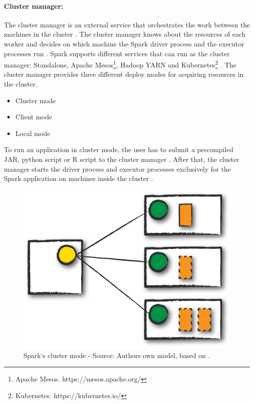 \paragraph{Cluster manager:}
The cluster manager is an external service that orchestrates the work between the machines in the cluster \cite{Hien2018Spark, Apache2020Spark}. The cluster manager knows about the resources of each worker and decides on which machine the Spark driver process and the executor processes run \cite{Hien2018Spark, Chambers2018Spark}.
Spark supports different services that can run as the cluster manager: Standalone, Apache Mesos\footnote{Apache Mesos. https://mesos.apache.org/}, Hadoop YARN\cite{Murthy2013Yarn} and Kubernetes\footnote{Kubernetes. https://kubernetes.io/} \cite{Apache2020Spark}.
The cluster manager provides three different deploy modes for acquiring resources in the cluster.
\begin{itemize}
\item Cluster mode
\item Client mode
\item Local mode
\end{itemize}

To run an application in cluster mode, the user has to submit a precompiled JAR, python script or R script to the cluster manager \cite{Chambers2018Spark}. After that, the cluster manager starts the driver process and executor processes exclusively for the Spark application on machines inside the cluster \cite{Chambers2018Spark, Hien2018Spark}.
\begin{figure}[h]%
\centering
\includegraphics[scale=0.5]{images/04_technical_background/cluster_mode}%
\caption{Spark`s cluster mode - Source: Authors own model, based on \cite{Chambers2018Spark}.}%
\label{fig:spark_cluster_mode}%
\end{figure}

